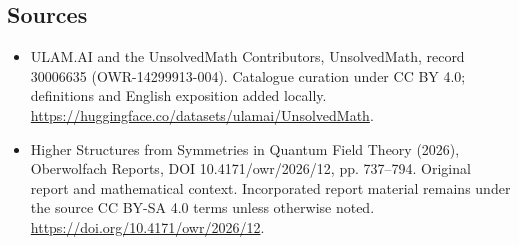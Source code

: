 \documentclass[11pt]{article}
\begin{document}
\subsection{Sources}
\begin{itemize}
\item[\hypertarget{source:30006635:1}{S1}] ULAM.AI and the UnsolvedMath Contributors, UnsolvedMath, record 30006635 (OWR-14299913-004). Catalogue curation under CC BY 4.0; definitions and English exposition added locally.
\url{https://huggingface.co/datasets/ulamai/UnsolvedMath}.
\item[\hypertarget{source:30006635:2}{S2}] Higher Structures from Symmetries in Quantum Field Theory (2026), Oberwolfach Reports, DOI 10.4171/owr/2026/12, pp. 737--794. Original report and mathematical context. Incorporated report material remains under the source CC BY-SA 4.0 terms unless otherwise noted.
\url{https://doi.org/10.4171/owr/2026/12}.
\end{itemize}
\label{end:30006635}
\end{document}
